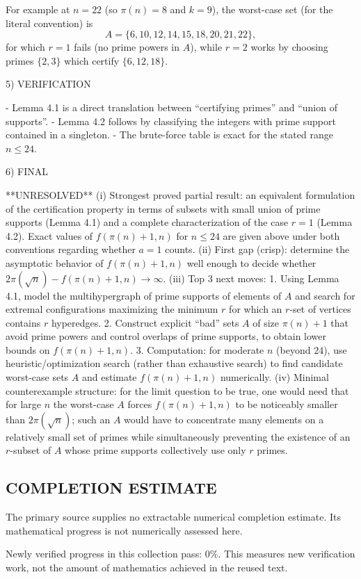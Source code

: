 For example at $n=22$ (so $\pi(n)=8$ and $k=9$), the worst-case set (for the literal convention) is
\[
A=\{6,10,12,14,15,18,20,21,22\},
\]
for which $r=1$ fails (no prime powers in $A$), while $r=2$ works by choosing primes $\{2,3\}$ which certify $\{6,12,18\}$.

5) VERIFICATION

- Lemma 4.1 is a direct translation between ``certifying primes'' and ``union of supports''.
- Lemma 4.2 follows by classifying the integers with prime support contained in a singleton.
- The brute-force table is exact for the stated range $n\le 24$.

6) FINAL

**UNRESOLVED**
(i) Strongest proved partial result: an equivalent formulation of the certification property in terms of subsets with small union of prime supports (Lemma 4.1) and a complete characterization of the case $r=1$ (Lemma 4.2). Exact values of $f(\pi(n)+1,n)$ for $n\le 24$ are given above under both conventions regarding whether $a=1$ counts.
(ii) First gap (crisp): determine the asymptotic behavior of $f(\pi(n)+1,n)$ well enough to decide whether $2\pi(\sqrt n)-f(\pi(n)+1,n)\to\infty$.
(iii) Top 3 next moves:
  1. Using Lemma 4.1, model the multihypergraph of prime supports of elements of $A$ and search for extremal configurations maximizing the minimum $r$ for which an $r$-set of vertices contains $r$ hyperedges.
  2. Construct explicit ``bad'' sets $A$ of size $\pi(n)+1$ that avoid prime powers and control overlaps of prime supports, to obtain lower bounds on $f(\pi(n)+1,n)$.
  3. Computation: for moderate $n$ (beyond $24$), use heuristic/optimization search (rather than exhaustive search) to find candidate worst-case sets $A$ and estimate $f(\pi(n)+1,n)$ numerically.
(iv) Minimal counterexample structure: for the limit question to be true, one would need that for large $n$ the worst-case $A$ forces $f(\pi(n)+1,n)$ to be noticeably smaller than $2\pi(\sqrt n)$; such an $A$ would have to concentrate many elements on a relatively small set of primes while simultaneously preventing the existence of an $r$-subset of $A$ whose prime supports collectively use only $r$ primes.


\subsection*{COMPLETION ESTIMATE}
The primary source supplies no extractable numerical completion estimate. Its mathematical progress is not numerically assessed here.

Newly verified progress in this collection pass: $0\%$. This measures new verification work, not the amount of mathematics achieved in the reused text.
